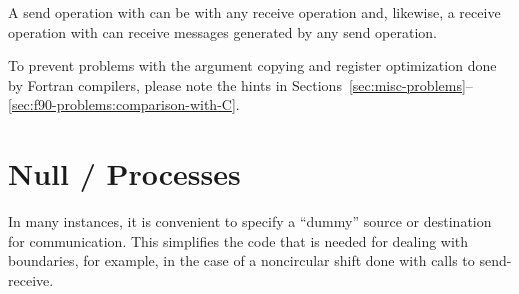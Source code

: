 A send operation 
with  can be  with
any receive operation and, likewise, a receive operation 
with  can receive messages generated by any send
operation.

\begin{users}
  To prevent problems with the argument copying and register optimization done
  by Fortran compilers, please note the hints in
Sections~\ref{sec:misc-problems}--\ref{sec:f90-problems:comparison-with-C}.
\end{users}

\section{Null \texorpdfstring{\MPI/}{MPI} Processes}
\label{sec:pt2pt-nullproc}

In many instances, it is convenient to specify a ``dummy'' source or
destination
for communication.  This simplifies the code that is needed for dealing with
boundaries, for example, in the case of a noncircular shift done with calls to
send-receive.


